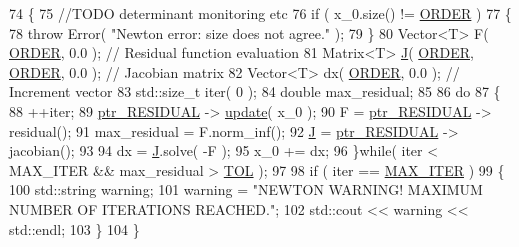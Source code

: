\begin{DoxyCode}
74     \{
75         \textcolor{comment}{//TODO determinant monitoring etc}
76         \textcolor{keywordflow}{if} ( x\_0.size() != \hyperlink{classLuna_1_1Newton_a7d549b60ff6d4285d8cbbf6f958c7d88}{ORDER} )
77         \{
78             \textcolor{keywordflow}{throw} Error( \textcolor{stringliteral}{"Newton error: size does not agree."} );
79         \}
80         Vector<T> F( \hyperlink{classLuna_1_1Newton_a7d549b60ff6d4285d8cbbf6f958c7d88}{ORDER}, 0.0 );               \textcolor{comment}{// Residual function evaluation}
81         Matrix<T> \hyperlink{namespaceHeat__plot_a3cafcec38d886f33b35756791964bb58}{J}( \hyperlink{classLuna_1_1Newton_a7d549b60ff6d4285d8cbbf6f958c7d88}{ORDER}, \hyperlink{classLuna_1_1Newton_a7d549b60ff6d4285d8cbbf6f958c7d88}{ORDER}, 0.0 );        \textcolor{comment}{// Jacobian matrix}
82         Vector<T> dx( \hyperlink{classLuna_1_1Newton_a7d549b60ff6d4285d8cbbf6f958c7d88}{ORDER}, 0.0 );              \textcolor{comment}{// Increment vector}
83         std::size\_t iter( 0 );
84         \textcolor{keywordtype}{double} max\_residual;
85 
86         \textcolor{keywordflow}{do}
87         \{
88             ++iter;
89             \hyperlink{classLuna_1_1Newton_a5cb2983ea8e24c4832a3fb0bdde84b8f}{ptr\_RESIDUAL} -> \hyperlink{classLuna_1_1Arclength_a8941ac2150d8a53aaefbf5825553c86b}{update}( x\_0 );
90             F = \hyperlink{classLuna_1_1Newton_a5cb2983ea8e24c4832a3fb0bdde84b8f}{ptr\_RESIDUAL} -> residual();
91             max\_residual = F.norm\_inf();
92             \hyperlink{namespaceHeat__plot_a3cafcec38d886f33b35756791964bb58}{J} = \hyperlink{classLuna_1_1Newton_a5cb2983ea8e24c4832a3fb0bdde84b8f}{ptr\_RESIDUAL} -> jacobian();
93 
94             dx = \hyperlink{namespaceHeat__plot_a3cafcec38d886f33b35756791964bb58}{J}.solve( -F );
95             x\_0 += dx;
96         \}\textcolor{keywordflow}{while}( iter < MAX\_ITER && max\_residual > \hyperlink{classLuna_1_1Newton_a13234002150648ac70297ef68a41c9c7}{TOL} );
97 
98         \textcolor{keywordflow}{if} ( iter == \hyperlink{classLuna_1_1Newton_ac8245444273c58c656a78ab0544833ce}{MAX\_ITER} )
99         \{
100             std::string warning;
101             warning = \textcolor{stringliteral}{"NEWTON WARNING! MAXIMUM NUMBER OF ITERATIONS REACHED."};
102             std::cout << warning << std::endl;
103         \}
104     \}
\end{DoxyCode}
\mbox{\label{classLuna_1_1Newton_a1d5ebdbfd8910c40ed58244f6348b13e}} 
